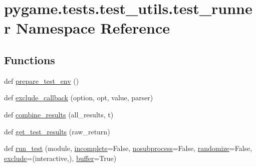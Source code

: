 \hypertarget{namespacepygame_1_1tests_1_1test__utils_1_1test__runner}{}\section{pygame.\+tests.\+test\+\_\+utils.\+test\+\_\+runner Namespace Reference}
\label{namespacepygame_1_1tests_1_1test__utils_1_1test__runner}
\subsection*{Functions}
\begin{DoxyCompactItemize}
\item 
def \hyperlink{namespacepygame_1_1tests_1_1test__utils_1_1test__runner_a77615b2c28ce697aa0e000a429ae03bb}{prepare\+\_\+test\+\_\+env} ()
\item 
def \hyperlink{namespacepygame_1_1tests_1_1test__utils_1_1test__runner_a8c554f36538099d997613efb39719e85}{exclude\+\_\+callback} (option, opt, value, parser)
\item 
def \hyperlink{namespacepygame_1_1tests_1_1test__utils_1_1test__runner_ad000b73bd906940716d33735bdbad726}{combine\+\_\+results} (all\+\_\+results, t)
\item 
def \hyperlink{namespacepygame_1_1tests_1_1test__utils_1_1test__runner_a331b1fbb8ee9c161c08e0b455d122281}{get\+\_\+test\+\_\+results} (raw\+\_\+return)
\item 
def \hyperlink{namespacepygame_1_1tests_1_1test__utils_1_1test__runner_a0179af2728831a06f9f56da5723d7d02}{run\+\_\+test} (module, \hyperlink{namespacepygame_1_1tests_1_1test__utils_1_1test__runner_aace67231de4b84a3b92334013269c6d2}{incomplete}=False, \hyperlink{namespacepygame_1_1tests_1_1test__utils_1_1test__runner_ae8b8a8972b418fd0df5e91433bbef20b}{nosubprocess}=False, \hyperlink{namespacepygame_1_1tests_1_1test__utils_1_1test__runner_a84c34040546c62967b1fb2f26ebb78c2}{randomize}=False, \hyperlink{namespacepygame_1_1tests_1_1test__utils_1_1test__runner_a816e2393565b0aed1ad014591e5476d9}{exclude}=(\textquotesingle{}interactive\textquotesingle{},), \hyperlink{structbuffer}{buffer}=True)
\end{DoxyCompactItemize}
